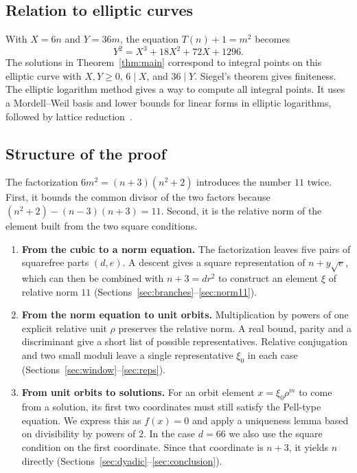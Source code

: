 \documentclass[a4paper,11pt]{article}
\theoremstyle{plain}
\theoremstyle{definition}
\theoremstyle{remark}
\numberwithin{equation}{section}
\numberwithin{table}{section}
\begin{document}
\subsection{Relation to elliptic curves}

With $X=6n$ and $Y=36m$, the equation $T(n)+1=m^2$ becomes
\[
Y^2=X^3+18X^2+72X+1296.
\]
The solutions in Theorem~\ref{thm:main} correspond to integral points on this elliptic curve with $X,Y\ge0$, $6\mid X$, and $36\mid Y$.
Siegel's theorem gives finiteness. The elliptic logarithm method gives a way to compute all integral points. It uses a Mordell--Weil basis and lower bounds for linear forms in elliptic logarithms, followed by lattice reduction~\cite{ST94,GPZ94}.

\subsection{Structure of the proof}

The factorization $6m^2=(n+3)(n^2+2)$ introduces the number $11$ twice. First, it bounds the common divisor of the two factors because $(n^2+2)-(n-3)(n+3)=11$. Second, it is the relative norm of the element built from the two square conditions.

\begin{enumerate}
\item \textbf{From the cubic to a norm equation.}
The factorization leaves five pairs of squarefree parts $(d,e)$. A descent gives a square representation of $n+y\sqrt e$, which can then be combined with $n+3=dr^2$ to construct an element $\xi$ of relative norm $11$ (Sections~\ref{sec:branches}--\ref{sec:norm11}).
\item \textbf{From the norm equation to unit orbits.}
Multiplication by powers of one explicit relative unit $\rho$ preserves the relative norm. A real bound, parity and a discriminant give a short list of possible representatives. Relative conjugation and two small moduli leave a single representative $\xi_0$ in each case (Sections~\ref{sec:window}--\ref{sec:reps}).
\item \textbf{From unit orbits to solutions.}
For an orbit element $x=\xi_0\rho^m$ to come from a solution, its first two coordinates must still satisfy the Pell-type equation. We express this as $f(x)=0$ and apply a uniqueness lemma based on divisibility by powers of $2$. In the case $d=66$ we also use the square condition on the first coordinate. Since that coordinate is $n+3$, it yields $n$ directly (Sections~\ref{sec:dyadic}--\ref{sec:conclusion}).
\end{enumerate}
\end{document}
